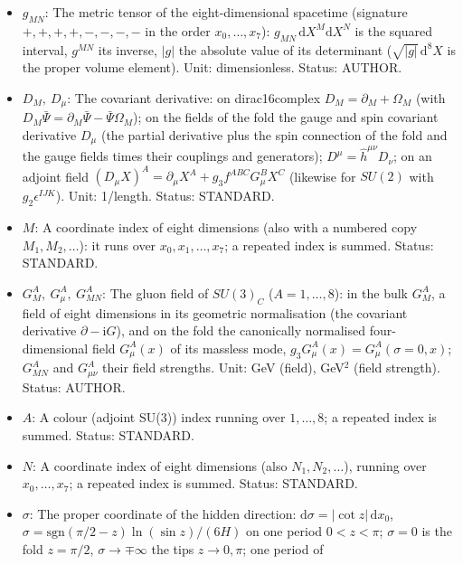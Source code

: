 \documentclass[
  10pt,
]{article}
\providecommand{\tightlist}{%
  \setlength{\itemsep}{0pt}\setlength{\parskip}{0pt}}
\begin{document}
\begin{itemize}
\tightlist
\item
  \(g_{MN}\): The metric tensor of the eight-dimensional spacetime
  (signature \(+,+,+,+,-,-,-,-\) in the order \(x_0, \dots, x_7\)):
  \(g_{MN}\,\mathrm{d}X^M\mathrm{d}X^N\) is the squared interval,
  \(g^{MN}\) its inverse, \(\lvert g\rvert\) the absolute value of its
  determinant (\(\sqrt{\lvert g\rvert}\,\mathrm{d}^8X\) is the proper
  volume element). Unit: dimensionless. Status: AUTHOR.
\item
  \(D_M,\ D_\mu\): The covariant derivative: on dirac16complex
  \(D_M = \partial_M + \Omega_M\) (with
  \(D_M\bar\Psi = \partial_M\bar\Psi - \bar\Psi\Omega_M\)); on the
  fields of the fold the gauge and spin covariant derivative \(D_\mu\)
  (the partial derivative plus the spin connection of the fold and the
  gauge fields times their couplings and generators);
  \(D^\mu = \hat h^{\mu\nu}D_\nu\); on an adjoint field
  \((D_\mu X)^A = \partial_\mu X^A + g_3f^{ABC}G^B_\mu X^C\) (likewise
  for \(SU(2)\) with \(g_2\epsilon^{IJK}\)). Unit: 1/length. Status:
  STANDARD.
\item
  \(M\): A coordinate index of eight dimensions (also with a numbered
  copy \(M_1, M_2, \dots\)): it runs over \(x_0, x_1, \dots, x_7\); a
  repeated index is summed. Status: STANDARD.
\item
  \(G^A_M,\ G^A_\mu,\ G^A_{MN}\): The gluon field of \(SU(3)_C\)
  (\(A = 1, \dots, 8\)): in the bulk \(G^A_M\), a field of eight
  dimensions in its geometric normalisation (the covariant derivative
  \(\partial - \mathrm{i}G\)), and on the fold the canonically
  normalised four-dimensional field \(G^A_\mu(x)\) of its massless mode,
  \(g_3G^A_\mu(x) = G^A_\mu(\sigma = 0, x)\); \(G^A_{MN}\) and
  \(G^A_{\mu\nu}\) their field strengths. Unit: GeV (field), GeV\(^2\)
  (field strength). Status: AUTHOR.
\item
  \(A\): A colour (adjoint SU(3)) index running over \(1, \dots, 8\); a
  repeated index is summed. Status: STANDARD.
\item
  \(N\): A coordinate index of eight dimensions (also
  \(N_1, N_2, \dots\)), running over \(x_0, \dots, x_7\); a repeated
  index is summed. Status: STANDARD.
\item
  \(\sigma\): The proper coordinate of the hidden direction:
  \(\mathrm{d}\sigma = \lvert\cot z\rvert\,\mathrm{d}x_0\),
  \(\sigma = \mathrm{sgn}(\pi/2 - z)\ln(\sin z)/(6H)\) on one period
  \(0 < z < \pi\); \(\sigma = 0\) is the fold \(z = \pi/2\),
  \(\sigma \to \mp\infty\) the tips \(z \to 0, \pi\); one period of

\end{itemize}
\end{document}
